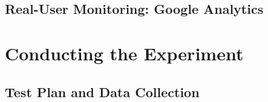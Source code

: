 











\subsection{Real-User Monitoring: Google Analytics}






\section{Conducting the Experiment}


\subsection{Test Plan and Data Collection}

